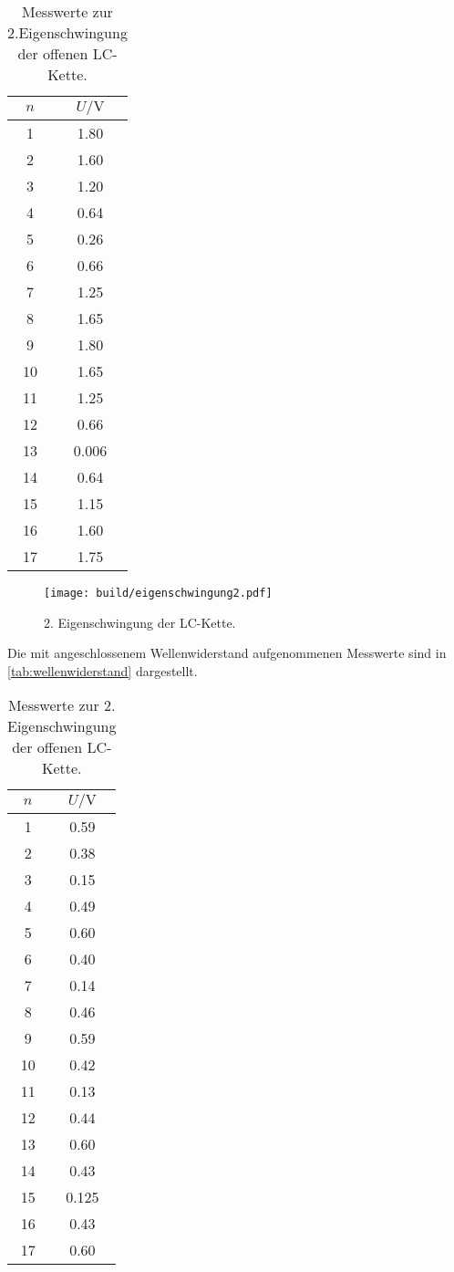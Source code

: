 \begin{table}
  \centering
  \caption{Messwerte zur 2.Eigenschwingung der offenen LC-Kette.}
  \label{tab:eigenschwingung2}
  \begin{tabular}{c c}
    \toprule
    $n$ & $U / \si{\volt}$ \\
\midrule
1 & 1.80 \\
2 & 1.60 \\
3 & 1.20 \\
4 & 0.64 \\
5 & 0.26 \\
6 & 0.66 \\
7 & 1.25 \\
8 & 1.65 \\
9 & 1.80 \\
10 & 1.65 \\
11 & 1.25 \\
12 & 0.66 \\
13 & 0.006 \\
14 & 0.64 \\
15 & 1.15 \\
16 & 1.60 \\
17 & 1.75 \\
\bottomrule
\end{tabular}
\end{table}

\begin{figure}
  \centering
  \texttt{[image: build/eigenschwingung2.pdf]}
\caption{2. Eigenschwingung der LC-Kette.}
  \label{fig:eigenschwingung2}
\end{figure}

Die mit angeschlossenem Wellenwiderstand aufgenommenen Messwerte sind in \ref{tab:wellenwiderstand} dargestellt.
\begin{table}
  \centering
  \caption{Messwerte zur 2. Eigenschwingung der offenen LC-Kette.}
  \label{tab:eigenschwingung2}
  \begin{tabular}{c c}
    \toprule
    $n$ & $U / \si{\volt}$\\
    \midrule
1 & 0.59 \\
2 & 0.38 \\
3 & 0.15 \\
4 & 0.49 \\
5 & 0.60 \\
6 & 0.40 \\
7 & 0.14 \\
8 & 0.46 \\
9 & 0.59 \\
10 & 0.42 \\
11 & 0.13 \\
12 & 0.44 \\
13 & 0.60 \\
14 & 0.43 \\
15 & 0.125 \\
16 & 0.43 \\
17 & 0.60 \\
\bottomrule
\end{tabular}
\end{table}

